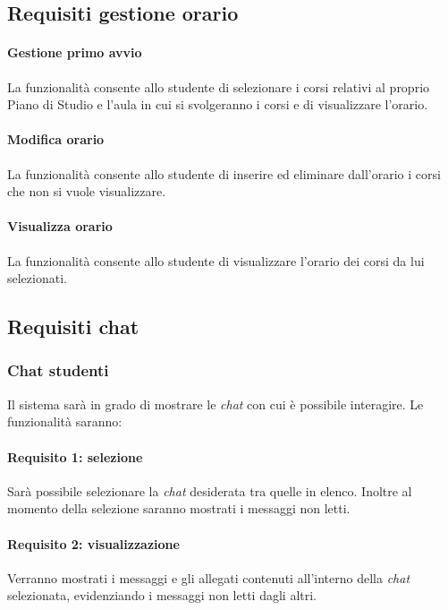 \subsection{Requisiti gestione orario}
\paragraph{Gestione primo avvio\\} 
La funzionalità consente allo studente di selezionare i corsi relativi al proprio Piano di Studio e l’aula in cui si svolgeranno i corsi e di visualizzare l'orario. 

\paragraph{Modifica orario\\} 
La funzionalità consente allo studente di inserire ed eliminare dall’orario i corsi che non si vuole visualizzare. 

\paragraph{Visualizza orario\\}
La funzionalità consente allo studente di visualizzare l’orario dei corsi da lui selezionati.

\subsection{Requisiti chat}

\subsubsection{Chat studenti}
Il sistema sarà in grado di mostrare le \emph{chat} con cui è possibile interagire. Le funzionalità saranno:

\paragraph{Requisito 1: selezione\\} 
Sarà possibile selezionare la \emph{chat} desiderata tra quelle in elenco. Inoltre al momento della selezione saranno mostrati i messaggi non letti.

\paragraph{Requisito 2: visualizzazione\\}
Verranno mostrati i messaggi e gli allegati contenuti all’interno della \emph{chat} selezionata, evidenziando i messaggi non letti dagli altri.

